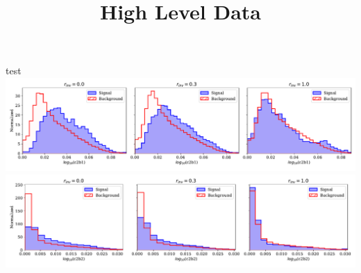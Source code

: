 \documentclass[aps,prd,twocolumn,superscriptaddress,preprintnumbers,nofootinbib,longbibliography,floatfix]{revtex4-1}
\begin{document}
\title{High Level Data}
test
\includegraphics{../figures/HL/by_sig_bkg/linear/c2b1.pdf}
\includegraphics{../figures/HL/by_sig_bkg/linear/c2b2.pdf}
\end{document}

